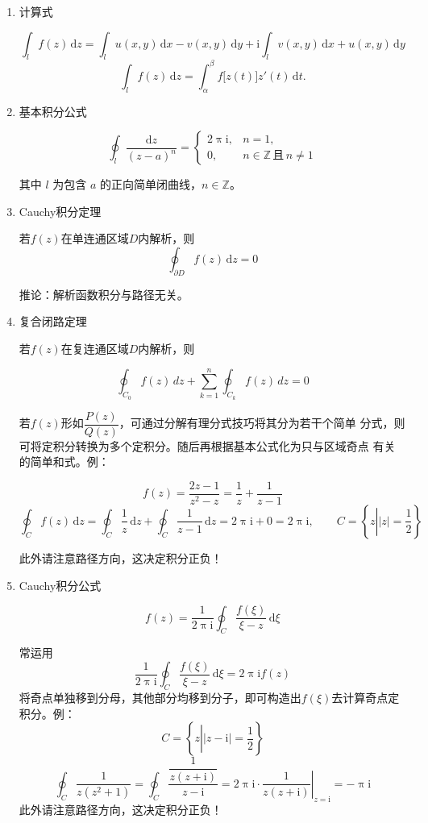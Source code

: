 \documentclass[UTF8,fontset=fandol,zihao=5]{ctexart}
\newcommand{\ii}{\mathrm{i}}
\newcommand{\ZZ}{\mathbb{Z}}
\newcommand{\dd}{\,\mathrm{d}}
\begin{document}
\begin{enumerate}
  
  \item 计算式
  
  \[
  \int_{l} f(z) \dd z = \int_l u(x,y)\dd x - v(x,y)\dd y + \ii\int_l v(x,y)\dd x + u(x,y)\dd y
  \]
  \[
  \int_{l} f(z) \dd z = \int_{\alpha}^{\beta} f\bigl[z(t)\bigr]z'(t) \dd t.
  \]

  \item 基本积分公式
  
  \[
  \oint_l \frac{\mathrm{d}z}{(z-a)^n}
  =
  \begin{cases}
  2\uppi\ii, & n=1, \\[6pt]
  0, & n \in \ZZ \, \text{且} \, n \ne 1
  \end{cases}
  \]

  其中 \(l\) 为包含 \(a\) 的正向简单闭曲线，\(n\in\mathbb Z\)。

  \item Cauchy积分定理
  
  若$f(z)$在单连通区域$D$内解析，则
  \[
  \oint_{\partial D} f(z) \dd z = 0
  \]

  推论：解析函数积分与路径无关。

  \item 复合闭路定理

  若$f(z)$在复连通区域$D$内解析，则
  
  \[
  \oint_{C_0}f(z)\,dz+
  \sum_{k=1}^{n}\oint_{C_k}f(z)\,dz=0
  \]

  \begin{methodbox}[【技巧】运用复合闭路定理计算定积分]
    若$f(z)$形如$\dfrac{P(z)}{Q(z)}$，可通过分解有理分式技巧将其分为若干个简单
    分式，则可将定积分转换为多个定积分。随后再根据基本公式化为只与区域奇点
    有关的简单和式。例：

    \[
    f(z)=\frac{2z-1}{z^2-z}=\frac{1}{z}+\frac{1}{z-1}
    \]
    \[
    \oint_{C}f(z)\dd z=\oint_{C}\frac{1}{z}\dd z+\oint_{C}\frac{1}{z-1}\dd z=2\uppi\ii+0=2\uppi\ii,\qquad
    C=\left\{z\left|\left|z\right|=\frac{1}{2}\right.\right\}
    \]

    此外请注意路径方向，这决定积分正负！
  \end{methodbox}

  \item Cauchy积分公式
  
  \[
  f(z)=\frac{1}{2\uppi\ii}\oint_{C}\frac{f(\xi)}{\xi-z}\dd \xi
  \]

  \begin{methodbox}[【技巧】运用Cauchy积分公式计算定积分]
    常运用
    \[
    \frac{1}{2\uppi\ii}\oint_{C}\frac{f(\xi)}{\xi-z}\dd \xi=2\uppi\ii f(z)
    \]
    将奇点单独移到分母，其他部分均移到分子，即可构造出$f(\xi)$去计算奇点定积分。例：
    \[
    C=\left\{z\left|\left|z-\ii\right|=\frac{1}{2}\right.\right\}
    \]
    \[
    \oint_{C}\frac{1}{z(z^2+1)}
    =\oint_{C}\frac{\dfrac{1}{z(z+\ii)}}{z-\ii}
    =2\uppi\ii\cdot\left. \frac{1}{z(z+\ii)} \right|_{z=\ii} = -\uppi\ii
    \]
    此外请注意路径方向，这决定积分正负！
  \end{methodbox}


\end{enumerate}
\end{document}
